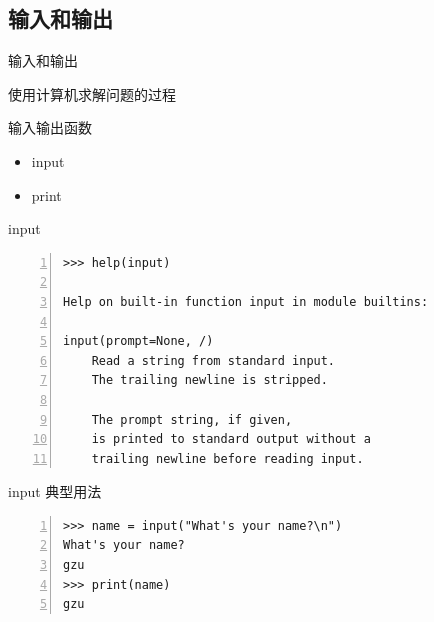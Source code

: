\documentclass{beamer}
\begin{document}
\subsection{输入和输出}
\begin{frame}{输入和输出}
\begin{block}{使用计算机求解问题的过程}
\end{block}
\begin{block}{输入输出函数}
\begin{itemize}
\item input
\item print
\end{itemize}
\end{block}
\end{frame}
\begin{frame}[fragile]{input}
\begin{block}{}
\begin{Verbatim}[numbers=left,frame=single,rulecolor=\color{red}]
>>> help(input)

Help on built-in function input in module builtins:

input(prompt=None, /)
    Read a string from standard input.  
    The trailing newline is stripped.
    
    The prompt string, if given, 
    is printed to standard output without a
    trailing newline before reading input.
\end{Verbatim}
\end{block}

\end{frame}

\begin{frame}[fragile]{input 典型用法}
\begin{block}{}
\begin{Verbatim}[numbers=left,frame=single,rulecolor=\color{red}]
>>> name = input("What's your name?\n")
What's your name?
gzu
>>> print(name)
gzu
\end{Verbatim}
\end{block}

\end{frame}
\end{document}
